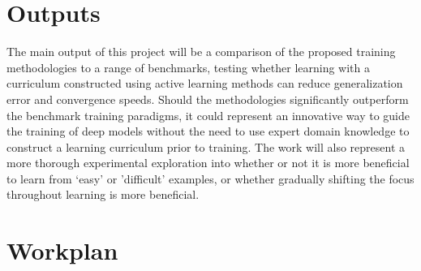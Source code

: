 \documentclass[a4paper,11pt]{article}
\begin{document}
\section{Outputs}
The main output of this project will be a comparison of the proposed training methodologies to a range of benchmarks, testing whether learning with a curriculum constructed using active learning methods can reduce generalization error and convergence speeds. Should the methodologies significantly outperform the benchmark training paradigms, it could represent an innovative way to guide the training of deep models without the need to use expert domain knowledge to construct a learning curriculum prior to training. The work will also represent a more thorough experimental exploration into whether or not it is more beneficial to learn from `easy' or 'difficult' examples, or whether gradually shifting the focus throughout learning is more beneficial.

\section{Workplan}

\newpage
\end{document}
